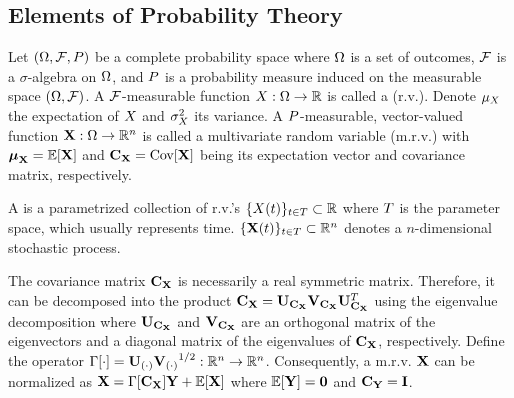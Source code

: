 \subsection{Elements of Probability Theory} 
Let $(\Omega, \mathcal{F}, P)$ be a complete probability space \cite{durrett2010} where $\Omega$ is a set of outcomes, $\mathcal{F}$ is a $\sigma$-algebra on $\Omega$, and $P$ is a probability measure induced on the measurable space $(\Omega, \mathcal{F})$. A $\mathcal{F}$-measurable function $X: \Omega \to \mathbb{R}$ is called a  (r.v.). Denote $\mu_X$ the expectation of $X$ and $\sigma^2_X$ its variance. A $P$-measurable, vector-valued function $\mathbf{X}: \Omega \to \mathbb{R}^n$ is called a multivariate random variable (m.r.v.) with ${\boldsymbol\mu}_{\mathbf{X}} = \mathbb{E}[\mathbf{X}]$ and $\mCov_\mrv{X} = \oCov{\mrv{X}}$ being its expectation vector and covariance matrix, respectively.

A  is a parametrized collection of r.v.'s $\{ X(t) \}_{t \in T} \subset \mathbb{R}$ where $T$ is the parameter space, which usually represents time. $\{ \mathbf{X}(t) \}_{t \in T} \subset \mathbb{R}^n$ denotes a $n$-dimensional stochastic process.

The covariance matrix $\mCov_\mrv{X}$ is necessarily a real symmetric matrix. Therefore, it can be decomposed into the product $\mCov_\mrv{X} = \m{U}_{\mCov_\mrv{X}} \m{V}_{\mCov_\mrv{X}} \m{U}_{\mCov_\mrv{X}}^T$ using the eigenvalue decomposition \cite{press2007} where $\m{U}_{\mCov_\mrv{X}}$ and $\m{V}_{\mCov_\mrv{X}}$ are an orthogonal matrix of the eigenvectors and a diagonal matrix of the eigenvalues of $\mCov_\mrv{X}$, respectively. Define the operator $\oEigen{\cd} = \m{U}_{(\cd)} {\m{V}_{(\cd)}}^{1/2}: \real^n \to \real^n$. Consequently, a m.r.v. $\mathbf{X}$ can be normalized as $\mrv{X} = \oEigen{\mCov_\mrv{X}} \mrv{Y} + \oExp{\mrv{X}}$ where $\oExp{\mrv{Y}} = \mZ$ and $\mCov_\mrv{Y} = \mI$.
